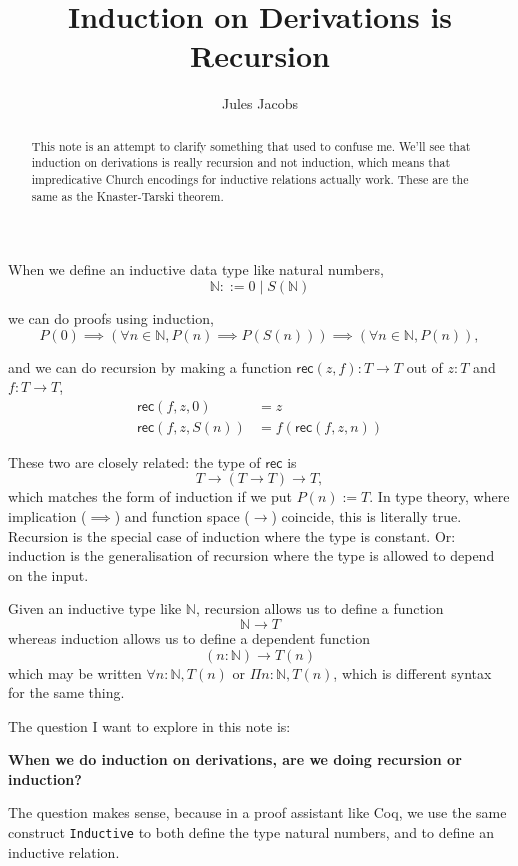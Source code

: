 \documentclass[a4paper, 11pt]{article}
\title{Induction on Derivations is Recursion}
\author{Jules Jacobs}
\newcommand{\N}{\mathbb{N}}
\newcommand{\rec}{\mathsf{rec}}
\theoremstyle{definition}
\begin{document}
\maketitle

\begin{abstract}
  This note is an attempt to clarify something that used to confuse me. We'll see that induction on derivations is really recursion and not induction, which means that impredicative Church encodings for inductive relations actually work. These are the same as the Knaster-Tarski theorem.
\end{abstract}

When we define an inductive data type like natural numbers,
\[
  \N ::= 0 \mid S(\N)
\]

we can do proofs using induction,
\[
  P(0) \implies (\forall n\in \N, P(n) \implies P(S(n))) \implies (\forall n\in \N, P(n)),
\]

and we can do recursion by making a function $\rec(z,f) : T \to T$ out of $z : T$ and $f : T \to T$,
\begin{align*}
  \rec(f,z,0) &= z \\
  \rec(f,z,S(n)) &= f(\rec(f,z,n))
\end{align*}

These two are closely related: the type of $\rec$ is
\[
  T \to (T \to T) \to T,
\]
which matches the form of induction if we put $P(n) := T$. In type theory, where implication ($\implies$) and function space ($\to$) coincide, this is literally true. Recursion is the special case of induction where the type is constant. Or: induction is the generalisation of recursion where the type is allowed to depend on the input.

Given an inductive type like $\N$, recursion allows us to define a function
\[
  \N \to T
\]
whereas induction allows us to define a dependent function
\[
  (n : \N) \to T(n)
\]
which may be written $\forall n : \N, T(n)$ or $\Pi n : \N, T(n)$, which is different syntax for the same thing.

The question I want to explore in this note is:

\begin{center}
  \textbf{When we do induction on derivations, are we doing recursion or induction?}
\end{center}

The question makes sense, because in a proof assistant like Coq, we use the same construct \lstinline|Inductive| to both define the type natural numbers, and to define an inductive relation.
\end{document}

